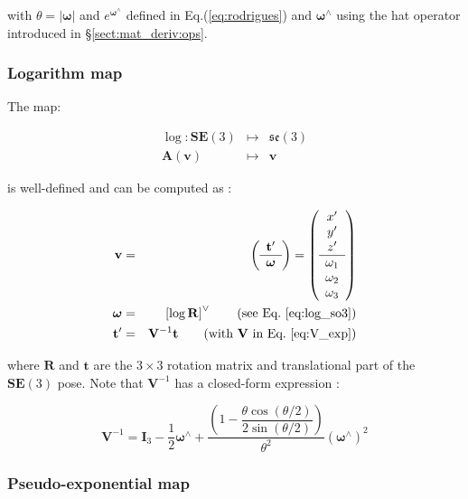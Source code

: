 \documentclass[a4paper,11pt]{report}
\newcommand{\W}{{\bm{\omega}}}
\newcommand{\hatop}[1]{#1^\wedge}
\begin{document}
\noindent with $\theta = |\W|$ and $e^{\hatop{\W}}$
defined in Eq.(\ref{eq:rodrigues})
and $\hatop{\W}$ using the hat operator introduced in \S\ref{sect:mat_deriv:ops}.


\subsubsection{Logarithm map}

The map:

\begin{eqnarray}
  \log: \mathbf{SE}(3) &\mapsto& \mathfrak{se}(3) \\
  \mathbf{A}(\mathbf{v})  & \mapsto & \mathbf{v}
\nonumber
\end{eqnarray}

\noindent is well-defined and can be computed as \cite{wang2008nps}:

\begin{eqnarray}
\label{eq:rodrigues_ln_se3}
\mathbf{v} &=&
\left(
\begin{array}{c}
 \mathbf{t}' \\ \hline \W
\end{array}
\right)
=
\left(
\begin{array}{c}
 x'\\y'\\z' \\ \hline \omega_1 \\ \omega_2 \\ \omega_3
\end{array}
\right)
\nonumber \\
\W &=& \left[ \log \mathbf{R} \right]^\vee  \quad \quad \text{(see Eq.~\ref{eq:log_so3})}
\\
\mathbf{t}' &=& \mathbf{V}^{-1} \mathbf{t} \quad \quad \text{(with $\mathbf{V}$ in Eq.~\ref{eq:V_exp})}
\end{eqnarray}

\noindent where $\mathbf{R}$ and $\mathbf{t}$ are the $3 \times 3$ rotation matrix
and translational part of the $\mathbf{SE}(3)$ pose.
Note that $\mathbf{V}^{-1}$ has a closed-form expression \cite{gallier2003computing}:

\begin{equation}
\mathbf{V}^{-1} = \mathbf{I}_3 
- \dfrac{1}{2} \hatop{\W} + 
\dfrac{\left(
 1 - \dfrac{ \theta \cos(\theta/2)}{2 \sin(\theta / 2)}
\right) 
}{\theta^2}  (\hatop{\W})^2
\end{equation}


\subsubsection{Pseudo-exponential map}
\label{sect:se3_pseudo-exp}
\end{document}
